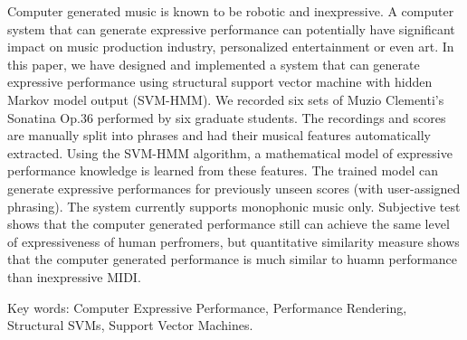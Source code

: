 \begin{abstractEN}

Computer generated music is known to be robotic and inexpressive. A computer system that can generate expressive performance can potentially have significant impact on music production industry, personalized entertainment or even art. In this paper, we have designed and implemented a system that can generate expressive performance using structural support vector machine with hidden Markov model output (SVM-HMM). We recorded six sets of Muzio Clementi's Sonatina Op.36 performed by six graduate students. The recordings and scores are manually split into phrases and had their musical features automatically extracted. Using the SVM-HMM algorithm, a mathematical model of expressive performance knowledge is learned from these features. The trained model can generate expressive performances for previously unseen scores (with user-assigned phrasing). The system currently supports monophonic music only. Subjective test shows that the computer generated performance still can achieve the same level of expressiveness of human perfromers, but quantitative similarity measure shows that the computer generated performance is much similar to huamn performance than inexpressive MIDI.

Key words: Computer Expressive Performance, Performance Rendering, Structural SVMs, Support Vector Machines.
\end{abstractEN}
